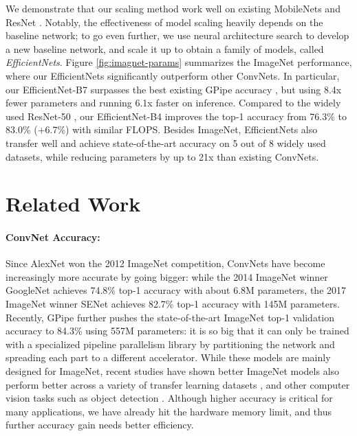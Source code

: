 \documentclass{article}
\begin{document}
We demonstrate that our scaling method work well on existing MobileNets \cite{mobilenetv117, mobilenetv218} and ResNet \cite{resnet16}. Notably, the effectiveness of model scaling heavily depends on the baseline network; to go even further, we  use neural architecture search \cite{nas_cifar17,mnas18} to develop a new  baseline network, and scale it up to obtain a family of models, called \emph{EfficientNets}. Figure \ref{fig:imagnet-params} summarizes the ImageNet performance, where our EfficientNets  significantly outperform other ConvNets. In particular, our EfficientNet-B7  surpasses the best existing GPipe accuracy \cite{gpipe18}, but using 8.4x fewer parameters and running 6.1x faster on inference. Compared to the widely used ResNet-50 \cite{resnet16}, our EfficientNet-B4 improves the top-1 accuracy from 76.3\% to 83.0\% (+6.7\%) with similar FLOPS. Besides ImageNet,  EfficientNets also transfer well and achieve state-of-the-art accuracy on 5 out of 8 widely used datasets, while reducing parameters by up to 21x than existing ConvNets.  %
\section{Related Work}                                                           
 \label{sec:related}
 
\paragraph{ConvNet Accuracy: } Since AlexNet \cite{alexnet12} won the 2012 ImageNet competition, ConvNets have become increasingly more accurate by going bigger: while the 2014 ImageNet winner GoogleNet \cite{googlenet14} achieves 74.8\% top-1 accuracy with about 6.8M parameters,  the 2017 ImageNet winner SENet \cite{senet18} achieves 82.7\% top-1 accuracy with 145M parameters. Recently, GPipe \cite{gpipe18} further pushes the state-of-the-art ImageNet top-1 validation accuracy to 84.3\% using 557M parameters:  it is so big that it can only be trained with a specialized pipeline parallelism library by partitioning the network and spreading each part to a different accelerator. While these models are mainly designed for ImageNet, recent studies have shown better ImageNet models also perform better across a variety of transfer learning datasets \cite{imagenettransfer18}, and other computer vision tasks such as object detection \cite{resnet16,mnas18}. Although higher accuracy is critical for many applications, we have already hit the hardware memory limit, and thus further accuracy gain needs better efficiency.
\end{document}
